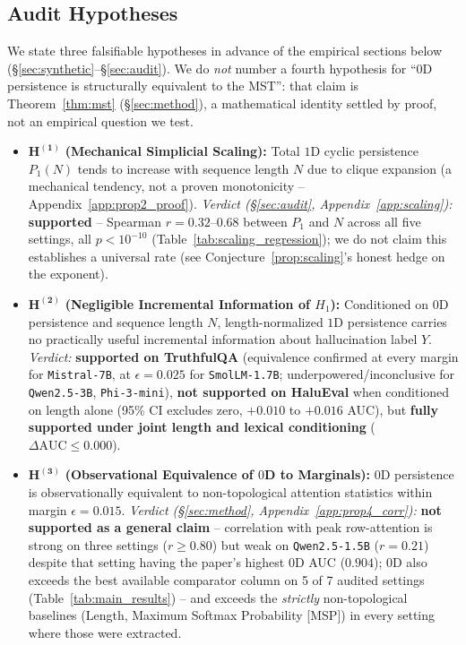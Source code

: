 \documentclass{article}
\begin{document}
\subsection{Audit Hypotheses}
We state three falsifiable hypotheses in advance of the empirical sections below (\S\ref{sec:synthetic}--\S\ref{sec:audit}). We do \emph{not} number a fourth hypothesis for ``$0$D persistence is structurally equivalent to the MST'': that claim is Theorem~\ref{thm:mst} (\S\ref{sec:method}), a mathematical identity settled by proof, not an empirical question we test.
\begin{itemize}
    \item $\mathbf{H^{(1)}}$ \textbf{(Mechanical Simplicial Scaling):} Total $1$D cyclic persistence $P_1(N)$ tends to increase with sequence length $N$ due to clique expansion (a mechanical tendency, not a proven monotonicity -- Appendix~\ref{app:prop2_proof}). \emph{Verdict (\S\ref{sec:audit}, Appendix~\ref{app:scaling}):} \textbf{supported} -- Spearman $r=0.32$--$0.68$ between $P_1$ and $N$ across all five settings, all $p<10^{-10}$ (Table~\ref{tab:scaling_regression}); we do not claim this establishes a universal rate (see Conjecture~\ref{prop:scaling}'s honest hedge on the exponent).
    \item $\mathbf{H^{(2)}}$ \textbf{(Negligible Incremental Information of $H_1$):} Conditioned on $0$D persistence and sequence length $N$, length-normalized $1$D persistence carries no practically useful incremental information about hallucination label $Y$. \emph{Verdict:} \textbf{supported on TruthfulQA} (equivalence confirmed at every margin for \texttt{Mistral-7B}, at $\epsilon{=}0.025$ for \texttt{SmolLM-1.7B}; underpowered/inconclusive for \texttt{Qwen2.5-3B}, \texttt{Phi-3-mini}), \textbf{not supported on HaluEval} when conditioned on length alone (95\% CI excludes zero, $+0.010$ to $+0.016$ AUC), but \textbf{fully supported under joint length and lexical conditioning} ($\Delta\text{AUC} \le 0.000$).
    \item $\mathbf{H^{(3)}}$ \textbf{(Observational Equivalence of $0$D to Marginals):} $0$D persistence is observationally equivalent to non-topological attention statistics within margin $\epsilon = 0.015$. \emph{Verdict (\S\ref{sec:method}, Appendix~\ref{app:prop4_corr}):} \textbf{not supported as a general claim} -- correlation with peak row-attention is strong on three settings ($r\ge0.80$) but weak on \texttt{Qwen2.5-1.5B} ($r=0.21$) despite that setting having the paper's highest $0$D AUC ($0.904$); $0$D also exceeds the best available comparator column on 5 of 7 audited settings (Table~\ref{tab:main_results}) -- and exceeds the \emph{strictly} non-topological baselines (Length, Maximum Softmax Probability [MSP]) in every setting where those were extracted.
\end{itemize}
\end{document}
